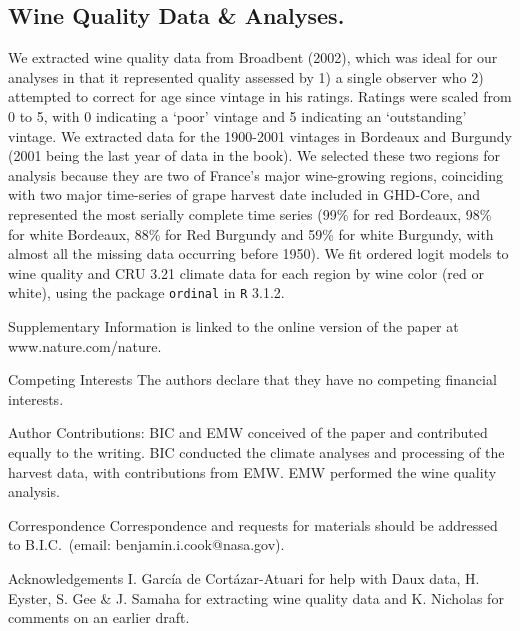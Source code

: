 \documentclass[final]{nature}
\begin{document}
\begin{methods}
\subsection{Wine Quality Data \& Analyses.}
\noindent We extracted wine quality data from Broadbent (2002)\cite{Broadbent2002}, which was ideal for our analyses in that it represented quality assessed by 1) a single observer who 2) attempted to correct for age since vintage in his ratings. Ratings were scaled from 0 to 5, with 0 indicating a `poor' vintage and 5 indicating an `outstanding' vintage. We extracted data for the 1900-2001 vintages in Bordeaux and Burgundy (2001 being the last year of data in the book). We selected these two regions for analysis because they are two of France's major wine-growing regions, coinciding with two major time-series of grape harvest date included in GHD-Core, and represented the most serially complete time series (99\% for red Bordeaux, 98\% for white Bordeaux, 88\% for Red Burgundy and 59\% for white Burgundy, with almost all the missing data occurring before 1950). We fit ordered logit models to wine quality and CRU 3.21 climate data for each region by wine color (red or white), using the package \verb|ordinal| in \verb|R| 3.1.2\cite{Rcore2014}.

\end{methods}






\pagebreak 
\begin{addendum}
 \item [Supplementary Information] is linked to the online version of the paper at www.nature.com/nature.
 \item[Competing Interests] The authors declare that they have no competing financial interests.
\item [Author Contributions:] BIC and EMW conceived of the paper and contributed equally to the writing. BIC conducted the climate analyses and processing of the harvest data, with contributions from EMW. EMW performed the wine quality analysis.
 \item[Correspondence] Correspondence and requests for materials
should be addressed to B.I.C.~(email: benjamin.i.cook@nasa.gov).
 \item[Acknowledgements] I. Garc\'ia de Cort\'azar-Atuari for help with Daux data, H. Eyster, S. Gee \& J. Samaha for extracting wine quality data and K. Nicholas for comments on an earlier draft.
\end{addendum}
\end{document}
